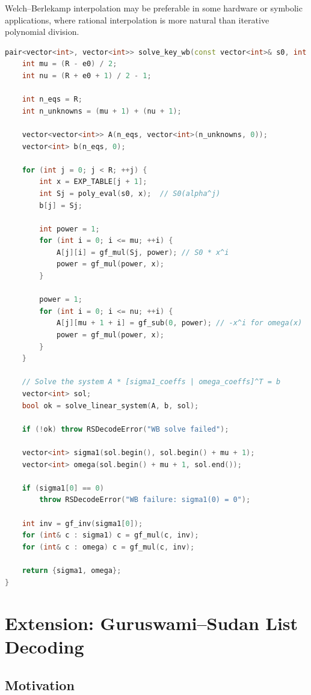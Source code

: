\documentclass[11pt]{article}
\begin{document}
Welch--Berlekamp interpolation may be preferable in some hardware or symbolic applications, where rational interpolation is more natural than iterative polynomial division.

\begin{lstlisting}[language=C++, caption={an implementation of WB decoding}]
	pair<vector<int>, vector<int>> solve_key_wb(const vector<int>& s0, int e0) {
    int mu = (R - e0) / 2;
    int nu = (R + e0 + 1) / 2 - 1;

    int n_eqs = R;
    int n_unknowns = (mu + 1) + (nu + 1); 

    vector<vector<int>> A(n_eqs, vector<int>(n_unknowns, 0));
    vector<int> b(n_eqs, 0);

    for (int j = 0; j < R; ++j) {
        int x = EXP_TABLE[j + 1];
        int Sj = poly_eval(s0, x);  // S0(alpha^j)
        b[j] = Sj;

        int power = 1;
        for (int i = 0; i <= mu; ++i) {
            A[j][i] = gf_mul(Sj, power); // S0 * x^i
            power = gf_mul(power, x);
        }

        power = 1;
        for (int i = 0; i <= nu; ++i) {
            A[j][mu + 1 + i] = gf_sub(0, power); // -x^i for omega(x)
            power = gf_mul(power, x);
        }
    }

    // Solve the system A * [sigma1_coeffs | omega_coeffs]^T = b
    vector<int> sol;
    bool ok = solve_linear_system(A, b, sol); 

    if (!ok) throw RSDecodeError("WB solve failed");

    vector<int> sigma1(sol.begin(), sol.begin() + mu + 1);
    vector<int> omega(sol.begin() + mu + 1, sol.end());

    if (sigma1[0] == 0)
        throw RSDecodeError("WB failure: sigma1(0) = 0");

    int inv = gf_inv(sigma1[0]);
    for (int& c : sigma1) c = gf_mul(c, inv);
    for (int& c : omega) c = gf_mul(c, inv);

    return {sigma1, omega};
}

\end{lstlisting}
\section{Extension: Guruswami--Sudan List Decoding}



\subsection{Motivation}
\end{document}
